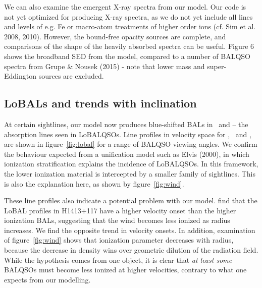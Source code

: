 \documentclass[preprint, a4paper, 11pt]{aastex}
\begin{document}
We can also examine the emergent X-ray spectra from our model. 
Our code is not yet optimized for producing X-ray spectra, as we do not yet 
include all lines and levels of e.g. Fe or macro-atom treatments of 
higher order ions (cf. Sim et al. 2008, 2010). 
However, the bound-free opacity sources are complete, and comparisons of the shape
of the heavily absorbed spectra can be useful.
Figure 6 shows the broadband SED from the model, compared to a number of BALQSO spectra
from Grupe \& Nousek (2015) - note that lower mass and super-Eddington sources
are excluded. 








\subsection{LoBALs and trends with inclination}

At certain sightlines, our model now produces blue-shifted BALs in \al\ and \mg --
the absorption lines seen in LoBALQSOs. Line profiles in velocity space 
for \civ, \al\ and \mg, are shown in figure~\ref{fig:lobal} for a range
of BALQSO viewing angles. We confirm the behaviour expected from 
a unification model such as Elvis (2000), in which ionization stratification
explains the incidence of LoBALQSOs. In this framework, the lower
ionization material is intercepted by a smaller family of sightlines.
This is also the explanation here, as shown by figure~\ref{fig:wind}.

These line profiles also indicate a potential problem with our model. 
\cite{odowd2015} find that the LoBAL profiles in H1413+117 have a 
higher velocity onset than the higher ionization BALs, suggesting that the
wind becomes less ionized as radius increases. 
We find the opposite trend in velocity onsets. In addition, examination of 
figure~\ref{fig:wind} shows that ionization parameter decreases with radius, 
because the decrease in density wins over geometric dilution of the radiation 
field. While the \cite{odowd2015} hypothesis comes from one object,
it is clear that {\em at least some} BALQSOs must become less ionized at 
higher velocities, contrary to what one expects from our modelling.
\end{document}
